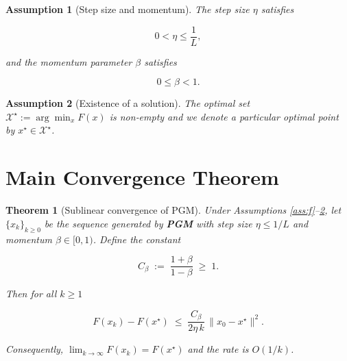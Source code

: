 \documentclass{article}
\newtheorem{theorem}{Theorem}
\newtheorem{assumption}{Assumption}
\begin{document}
\begin{assumption}[Step size and momentum]\label{ass:param}
The step size $\eta$ satisfies  

\[
0<\eta\le \frac{1}{L},
\tag{A3}
\]

and the momentum parameter $\beta$ satisfies  

\[
0\le\beta<1.
\tag{A4}
\]
\end{assumption}

\begin{assumption}[Existence of a solution]\label{ass:sol}
The optimal set $\mathcal{X}^{\star}:=\arg\min_{x}F(x)$ is non‑empty and we denote a particular optimal point by $x^{\star}\in\mathcal{X}^{\star}$.
\end{assumption}

\section*{Main Convergence Theorem}
\begin{theorem}[Sublinear convergence of PGM]\label{thm:sublinear}
Under Assumptions \ref{ass:f}–\ref{ass:sol}, let $\{x_{k}\}_{k\ge0}$ be the sequence generated by \textbf{PGM} with step size $\eta\le 1/L$ and momentum $\beta\in[0,1)$.  
Define the constant  

\[
C_{\beta}\;:=\;\frac{1+\beta}{1-\beta}\;\ge\;1 .
\]

Then for all $k\ge1$  

\[
F(x_{k})-F(x^{\star})\;\le\;
\frac{C_{\beta}}{2\eta\,k}\,\|x_{0}-x^{\star}\|^{2}.
\tag{T1}
\]

Consequently, $\displaystyle\lim_{k\to\infty}F(x_{k})=F(x^{\star})$ and the rate is $O(1/k)$.
\end{theorem}

\end{document}

